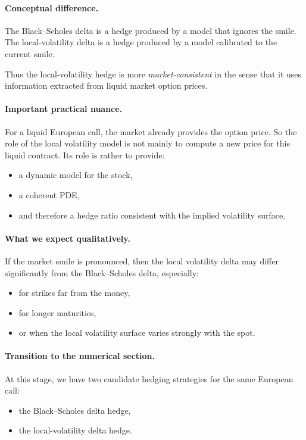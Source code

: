 \documentclass[11pt]{article}
\theoremstyle{plain}
\theoremstyle{definition}
\theoremstyle{remark}
\begin{document}
\paragraph{Conceptual difference.}
The Black--Scholes delta is a hedge produced by a model that ignores the
smile.
The local-volatility delta is a hedge produced by a model calibrated to
the current smile.

Thus the local-volatility hedge is more \emph{market-consistent} in the
sense that it uses information extracted from liquid market option
prices.

\paragraph{Important practical nuance.}
For a liquid European call, the market already provides the option
price.
So the role of the local volatility model is not mainly to compute a new
price for this liquid contract.
Its role is rather to provide:
\begin{itemize}[leftmargin=1.4em]
    \item a dynamic model for the stock,
    \item a coherent PDE,
    \item and therefore a hedge ratio consistent with the implied
    volatility surface.
\end{itemize}

\paragraph{What we expect qualitatively.}
If the market smile is pronounced, then the local volatility delta may
differ significantly from the Black--Scholes delta, especially:
\begin{itemize}[leftmargin=1.4em]
    \item for strikes far from the money,
    \item for longer maturities,
    \item or when the local volatility surface varies strongly with the
    spot.
\end{itemize}

\paragraph{Transition to the numerical section.}
At this stage, we have two candidate hedging strategies for the same
European call:
\begin{itemize}[leftmargin=1.4em]
    \item the Black--Scholes delta hedge,
    \item the local-volatility delta hedge.
\end{itemize}
\end{document}
